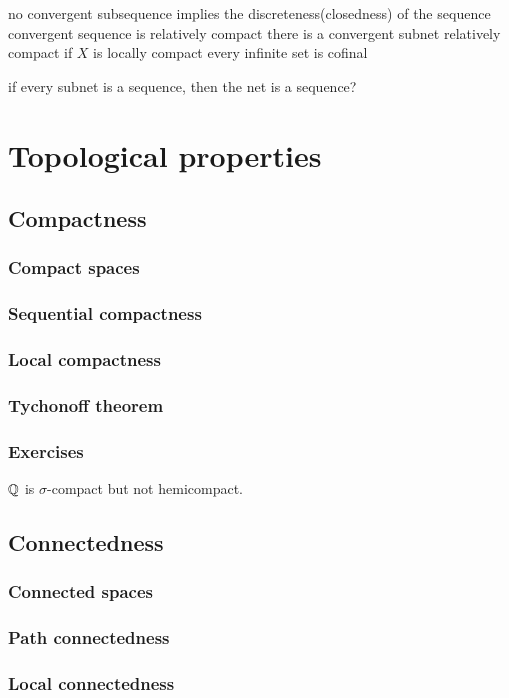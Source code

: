 \documentclass{../../large}
\begin{document}
no convergent subsequence implies the discreteness(closedness) of the sequence
convergent sequence is relatively compact
there is a convergent subnet relatively compact if $X$ is locally compact
every infinite set is cofinal


if every subnet is a sequence, then the net is a sequence?


\part{Topological properties}
\chapter{Compactness}
\section{Compact spaces}
\section{Sequential compactness}
\section{Local compactness}
\section{Tychonoff theorem}
\section*{Exercises}
\begin{prb}
$\mathbb{Q}$ is $\sigma$-compact but not hemicompact.
\end{prb}
\chapter{Connectedness}
\section{Connected spaces}
\section{Path connectedness}
\section{Local connectedness}
\end{document}
